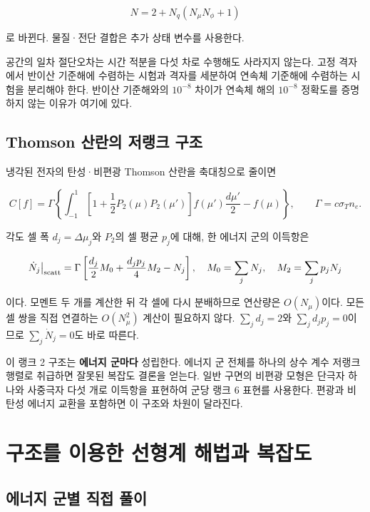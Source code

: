 \documentclass[
  10pt,
  a4paper,
]{article}
\begin{document}
\[
N=2+N_q(N_\mu N_\phi+1)
\]

로 바뀐다. 물질·전단 결합은 추가 상태 변수를 사용한다.

공간의 일차 절단오차는 시간 적분을 다섯 차로 수행해도 사라지지 않는다.
고정 격자에서 반이산 기준해에 수렴하는 시험과 격자를 세분하여 연속체
기준해에 수렴하는 시험을 분리해야 한다. 반이산 기준해와의 \(10^{-8}\)
차이가 연속체 해의 \(10^{-8}\) 정확도를 증명하지 않는 이유가 여기에
있다.

\hypertarget{thomson-uxc0b0uxb780uxc758-uxc800uxb7aduxd06c-uxad6cuxc870}{%
\subsection{Thomson 산란의 저랭크
구조}\label{thomson-uxc0b0uxb780uxc758-uxc800uxb7aduxd06c-uxad6cuxc870}}

냉각된 전자의 탄성·비편광 Thomson 산란을 축대칭으로 줄이면

\[
C[f]=\Gamma\left\{\int_{-1}^1
\left[1+\frac12P_2(\mu)P_2(\mu')\right]
f(\mu')\frac{d\mu'}2-f(\mu)\right\},\qquad
\Gamma=c\sigma_Tn_e.
\]

각도 셀 폭 \(d_j=\Delta\mu_j\)와 \(P_2\)의 셀 평균 \(p_j\)에 대해, 한
에너지 군의 이득항은

\[
\dot N_j\big|_{\rm scatt}
=\Gamma\left[\frac{d_j}{2}M_0+\frac{d_jp_j}{4}M_2-N_j\right],
\quad M_0=\sum_jN_j,\quad M_2=\sum_jp_jN_j
\]

이다. 모멘트 두 개를 계산한 뒤 각 셀에 다시 분배하므로 연산량은
\(O(N_\mu)\)이다. 모든 셀 쌍을 직접 연결하는 \(O(N_\mu^2)\) 계산이
필요하지 않다. \(\sum_jd_j=2\)와 \(\sum_jd_jp_j=0\)이므로
\(\sum_j\dot N_j=0\)도 바로 따른다.

이 랭크 2 구조는 \textbf{에너지 군마다} 성립한다. 에너지 군 전체를
하나의 상수 계수 저랭크 행렬로 취급하면 잘못된 복잡도 결론을 얻는다.
일반 구면의 비편광 모형은 단극자 하나와 사중극자 다섯 개로 이득항을
표현하여 군당 랭크 6 표현를 사용한다. 편광과 비탄성 에너지 교환을
포함하면 이 구조와 차원이 달라진다.

\hypertarget{uxad6cuxc870uxb97c-uxc774uxc6a9uxd55c-uxc120uxd615uxacc4-uxd574uxbc95uxacfc-uxbcf5uxc7a1uxb3c4}{%
\section{구조를 이용한 선형계 해법과
복잡도}\label{uxad6cuxc870uxb97c-uxc774uxc6a9uxd55c-uxc120uxd615uxacc4-uxd574uxbc95uxacfc-uxbcf5uxc7a1uxb3c4}}

\hypertarget{uxc5d0uxb108uxc9c0-uxad70uxbcc4-uxc9c1uxc811-uxd480uxc774}{%
\subsection{에너지 군별 직접
풀이}\label{uxc5d0uxb108uxc9c0-uxad70uxbcc4-uxc9c1uxc811-uxd480uxc774}}
\end{document}
